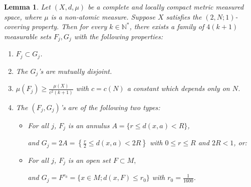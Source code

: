 \documentclass[12pt,reqno]{amsart}		%
\theoremstyle{plain}
\newtheorem{lemma}[thm]{Lemma}
\theoremstyle{definition}
\theoremstyle{remark}
\numberwithin{equation}{section}
\begin{document}
\begin{lemma}
\label{coveringlemma_intro}
Let $(X,d,\mu)$ be a complete and locally compact metric measured space, where $\mu$ is a non-atomic measure. Suppose $X$ satisfies the $(2,N;1)$-covering property. Then for every $k\in\mathbb{N}^{*}$, there exists a family of $4(k+1)$ measurable sets 
$F_j,G_j$ with the following properties:
  \begin{enumerate}
    \item $F_{j}\subset G_{j}$.
    \item The $G_{j}$'s are mutually disjoint.
		\item $\mu(F_{j})\geqslant \frac{\mu(X)}{c^{2}(k+1)}$ with $c=c(N)$ a constant which depends only on $N$.
		\medskip
    \item The $(F_{j},G_{j})$'s are of the following two types:
		 \begin{itemize}
		 	\item For all $j$, $F_{j}$ is an annulus $A=\{r\leqslant d(x,a)<R\}$,
		 	
		 	and $G_{j}=2A=\left\{\frac{r}{2}\leqslant d(x,a)<2R\right\}$ with $0\leqslant r \leqslant R$ and $2R<1$, or:
		 	\item For all $j$, $F_{j}$ is an open set $F\subset M,$
		 	
		 	and $G_{j}=F^{r_{0}}=\{x\in M;d(x,F)\leqslant r_{0}\}$ with $r_{0}=\frac{1}{1600}$.
		 \end{itemize}
     \end{enumerate}
\end{lemma}
\end{document}
